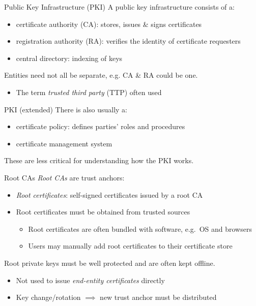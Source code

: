 \begin{frame}{Public Key Infrastructure (PKI)}
  A public key infrastructure consists of a:
  \begin{itemize}[<+(1)->]
    \item certificate authority (CA): stores, issues \& signs certificates
    \item registration authority (RA): verifies the identity of certificate requesters
    \item central directory: indexing of keys
  \end{itemize}

  \vspace*{1em}

  \pause
  Entities need not all be separate, e.g. CA \& RA could be one.
  \begin{itemize}
    \item The term \emph{trusted third party} (TTP) often used
  \end{itemize}
\end{frame}

\begin{frame}{PKI (extended)}
  \pause
  There is also usually a:
  \begin{itemize}[<+(1)->]
    \item certificate policy: defines parties' roles and procedures
    \item certificate management system
  \end{itemize}

  \pause
  These are less critical for understanding how the PKI works.
\end{frame}

\begin{frame}{Root CAs}
  \emph{Root CAs} are trust anchors:
  \begin{itemize}[<+(1)->]
    \item \emph{Root certificates}: self-signed certificates issued by a root CA
    \item Root certificates must be obtained from trusted sources
    \par
    \begin{itemize}
      \item Root certificates are often bundled with software, e.g.\ OS and browsers
      \item Users may manually add root certificates to their certificate store
    \end{itemize}
  \end{itemize}

  \vspace*{1em}

  \pause
  Root private keys must be well protected and are often kept offline.
  \begin{itemize}[<+(1)->]
    \item Not used to issue \emph{end-entity certificates} directly
    \item Key change/rotation $\implies$ new trust anchor must be distributed
  \end{itemize}
\end{frame}

